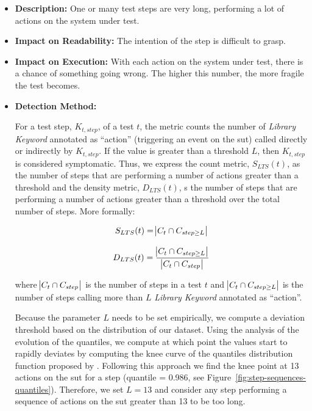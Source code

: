 \begin{itemize}
    \item \textbf{Description:} One or many test steps are very long, performing a lot of actions on the system under test.

    \item \textbf{Impact on Readability:} The intention of the step is difficult to grasp.
    
    \item \textbf{Impact on Execution:} With each action on the system under test, there is a chance of something going wrong. The higher this number, the more fragile the test becomes.
    
    \item \textbf{Detection Method:}
    
    For a test step, $K_{t, step}$, of a test $t$, the metric counts the number of \emph{Library Keyword} annotated as ``action'' (triggering an event on the \gls{sut}) called directly or indirectly by $K_{t, step}$. If the value is greater than a threshold $L$, then $K_{t, step}$ is considered symptomatic. Thus, we express the count metric, $S_{LTS}(t)$, as the number of steps that are performing a number of actions greater than a threshold and the density metric, $D_{LTS}(t)$, s the number of steps that are performing a number of actions greater than a threshold over the total number of steps. More formally:
    
    \begin{equation*}
        S_{LTS}(t) = \abs{C_t \cap C_{step \geq L}}
    \end{equation*}
    
    \begin{equation*}
        D_{LTS}(t) = \frac{\abs{C_t \cap C_{step \geq L}}}{\abs{C_t \cap C_{step}}}
    \end{equation*}
    
    where $\abs{C_t \cap C_{step}}$ is the number of steps in a test $t$ and $\abs{C_t \cap C_{step \geq L}}$ is the number of steps calling more than $L$ \emph{Library Keyword} annotated as ``action''. 
    
    Because the parameter $L$ needs to be set empirically, we compute a deviation threshold based on the distribution of our dataset. Using the analysis of the evolution of the quantiles, we compute at which point the values start to rapidly deviates by computing the knee curve of the quantiles distribution function proposed by \cite{Satopaa2011}. Following this approach we find the knee point at 13 actions on the \gls{sut} for a step (quantile = 0.986, see Figure~\ref{fig:step-sequences-quantiles}). Therefore, we set $L = 13$  and consider any step performing a sequence of actions on the \gls{sut} greater than 13 to be too long.


\end{itemize}
